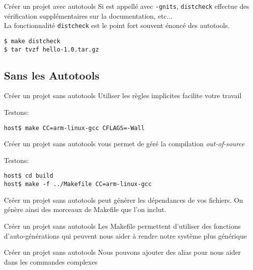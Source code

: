 \begin{frame}[fragile=singleslide]{Créer un projet avec autotools}
  Si   est appellé avec  \verb+-gnits+, \verb+distcheck+
  effectue des vérification supplémentaires sur la documentation,
  etc... 
  \\[2ex]
  La fonctionnalité \verb+distcheck+ est  le point fort souvent énoncé
  des autotools.
\begin{lstlisting}
$ make distcheck
$ tar tvzf hello-1.0.tar.gz
\end{lstlisting} %
\end{frame}

\subsection{Sans les Autotools}

\begin{frame}[fragile=singleslide]{Créer un projet sans autotools}
  Utiliser les règles implicites facilite votre travail
  
  Testons:
\begin{lstlisting}
host$ make CC=arm-linux-gcc CFLAGS=-Wall
\end{lstlisting} %
\end{frame}

\begin{frame}[fragile=singleslide]{Créer un projet sans autotools}
   vous permet de géré la compilation \emph{out-of-source}
  
  Testons:
\begin{lstlisting}
host$ cd build
host$ make -f ../Makefile CC=arm-linux-gcc
\end{lstlisting} %
\end{frame}

\begin{frame}[fragile=singleslide]{Créer un projet sans autotools}
   peut  générer les dépendances de vos  fichiers.  On génère
  ainsi des morceaux de Makefile que l'on inclut.
  
\end{frame}

\begin{frame}[fragile=singleslide]{Créer un projet sans autotools}
  Les Makefile permettent  d'utiliser des fonctions d'auto-générations
  qui  peuvent  nous  aider  à  rendre notre  système  plus  générique
  
\end{frame}

\begin{frame}[fragile=singleslide]{Créer un projet sans autotools}
  Nous pouvons  ajouter des alias  pour nous aider dans  les commandes
  complexes 
  
\end{frame}


